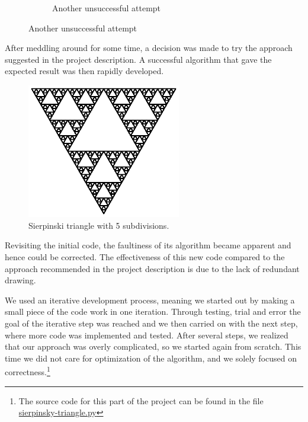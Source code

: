 \documentclass[titlepage]{article}
\begin{document}
\begin{figure}[H]
\begin{subfigure}[b]{0.5\textwidth}
    \caption{Another unsuccessful attempt}
  \end{subfigure}
\end{figure}
After meddling around for some time, a decision was made to try the approach suggested in the project description. A successful algorithm that gave the expected result was then rapidly developed.
\begin{figure}[H]
  \includegraphics[width=0.6\textwidth]{triangle}
  \caption{Sierpinski triangle with 5 subdivisions.}
\end{figure}
Revisiting the initial code, the faultiness of its algorithm became apparent and hence could be corrected. The effectiveness of this new code compared to the approach recommended in the project description is due to the lack of redundant drawing. \par We used an iterative development process, meaning we started out by making a small piece of the code work in one iteration. Through testing, trial and error the goal of the iterative step was reached and we then carried on with the next step, where more code was implemented and tested. After several steps, we realized that our approach was overly complicated, so we started again from scratch. This time we did not care for optimization of the algorithm, and we solely focused on correctness.\footnote{The source code for this part of the project can be found in the file \href{https://github.com/ErikAndersen81/DM550-FractalProject/blob/master/sierpinsky-triangle.py}{sierpinsky-triangle.py}}
\end{document}
